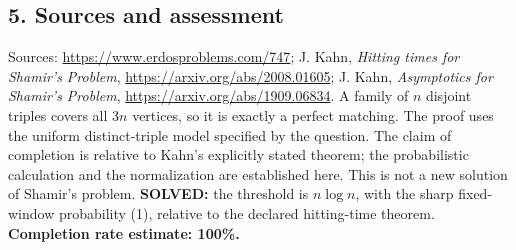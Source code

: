 \subsection*{5. Sources and assessment}
Sources: \url{https://www.erdosproblems.com/747}; J. Kahn, \emph{Hitting times for Shamir's Problem}, \url{https://arxiv.org/abs/2008.01605}; J. Kahn, \emph{Asymptotics for Shamir's Problem}, \url{https://arxiv.org/abs/1909.06834}.
A family of $n$ disjoint triples covers all $3n$ vertices, so it is exactly a perfect matching. The proof uses the uniform distinct-triple model specified by the question. The claim of completion is relative to Kahn's explicitly stated theorem; the probabilistic calculation and the normalization are established here. This is not a new solution of Shamir's problem.
\textbf{SOLVED:} the threshold is $n\log n$, with the sharp fixed-window probability (1), relative to the declared hitting-time theorem.
\textbf{Completion rate estimate: 100\%.}
